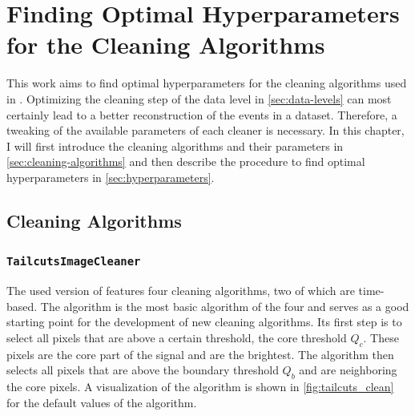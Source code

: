 \chapter{Finding Optimal Hyperparameters for the Cleaning Algorithms}
\label{ch:finding-hyperparams}

This work aims to find optimal hyperparameters for the cleaning algorithms used in \ctapipe{}.
Optimizing the cleaning step of the \dlo{} data level in \autoref{sec:data-levels} can most certainly lead to a better
reconstruction of the events in a dataset. Therefore, a tweaking of the available parameters of each
cleaner is necessary. In this chapter, I will first introduce the cleaning algorithms and their parameters
in \autoref{sec:cleaning-algorithms} and then describe the procedure to find optimal hyperparameters
in \autoref{sec:hyperparameters}.
\vspace{-0.5cm}
\section{Cleaning Algorithms}
\label{sec:cleaning-algorithms}
\vspace{-0.5cm}
\subsection*{\texttt{TailcutsImageCleaner}}
\vspace{-0.5cm}
The used version of \ctapipe{} features four cleaning algorithms, two of which are time-based.
The \tailcuts{} algorithm is the most basic algorithm of the four and serves as a good
starting point for the development of new cleaning algorithms. Its first step is to select all
pixels that are above a certain threshold, the core threshold \(Q_c\). These
pixels are the core part of the signal and are the brightest. The \tailcuts{} algorithm
then selects all pixels that are above the boundary threshold \(Q_b\) and are neighboring
the core pixels. A visualization of the algorithm is shown in \autoref{fig:tailcuts_clean} for the
default values of the algorithm.

